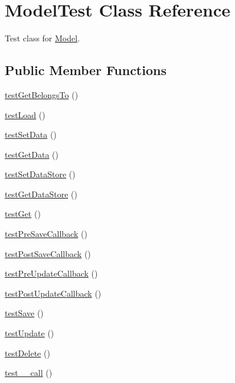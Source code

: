 \hypertarget{class_model_test}{
\section{ModelTest Class Reference}
\label{class_model_test}
}


Test class for \hyperlink{class_model}{Model}.  


\subsection*{Public Member Functions}
\begin{DoxyCompactItemize}
\item 
\hyperlink{class_model_test_ae1ff4b7c14e652802e32a984e47d10ff}{testGetBelongsTo} ()
\item 
\hyperlink{class_model_test_a112b5d8306fc68b542b5bc1b308a054d}{testLoad} ()
\item 
\hyperlink{class_model_test_af5bcc488e594c6cb77b7c27269fa1624}{testSetData} ()
\item 
\hyperlink{class_model_test_a224270719543e6a640f157744ae61d2a}{testGetData} ()
\item 
\hyperlink{class_model_test_a076bdaf3c6eddc312332f4f412b8ccf8}{testSetDataStore} ()
\item 
\hyperlink{class_model_test_a8eb1dc9a5088866c004549ef51fc1ba7}{testGetDataStore} ()
\item 
\hyperlink{class_model_test_aadc395097a679d2a80eaa2a9e114ecb1}{testGet} ()
\item 
\hyperlink{class_model_test_a6776b34011d028b0603c451ee4227ccb}{testPreSaveCallback} ()
\item 
\hyperlink{class_model_test_a6d869d70f95e46b2ac9cadd756d77eea}{testPostSaveCallback} ()
\item 
\hyperlink{class_model_test_ad1db65024e7f1954229799f5120e7dad}{testPreUpdateCallback} ()
\item 
\hyperlink{class_model_test_a101bd92e5d3dde8766b381dce5b2cb78}{testPostUpdateCallback} ()
\item 
\hyperlink{class_model_test_a315f493abb11f13ad60e02e207e4a6d0}{testSave} ()
\item 
\hyperlink{class_model_test_a8286d41bdc07488a633b6153751f4d86}{testUpdate} ()
\item 
\hyperlink{class_model_test_a73842693fc20ac2e6db6890bafb14527}{testDelete} ()
\item 
\hyperlink{class_model_test_ad7f39f737672e4da2de14de3f61d2028}{test\_\-\_\-call} ()

\end{DoxyCompactItemize}
